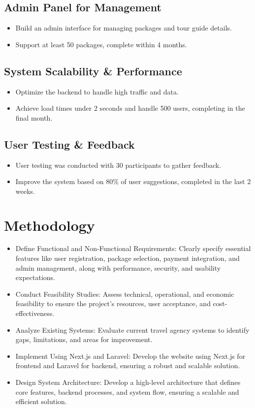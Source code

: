 \documentclass[12pt]{scrreprt}
\begin{document}
\subsection{Admin Panel for Management}
\begin{itemize}
    \item Build an admin interface for managing packages and tour guide details.
    \item Support at least 50 packages, complete within 4 months.
\end{itemize}

\subsection{System Scalability \& Performance}
\begin{itemize}
    \item Optimize the backend to handle high traffic and data.
    \item Achieve load times under 2 seconds and handle 500 users, completing in the final month.
\end{itemize}

\subsection{User Testing \& Feedback}
\begin{itemize}
    \item User testing was conducted with 30 participants to gather feedback.
    \item Improve the system based on 80\% of user suggestions, completed in the last 2 weeks.
\end{itemize}

\section{Methodology}
\begin{itemize}
    \item Define Functional and Non-Functional Requirements: Clearly specify essential features like user registration, package selection, payment integration, and admin management, along with performance, security, and usability expectations.
    \item Conduct Feasibility Studies: Assess technical, operational, and economic feasibility to ensure the project’s resources, user acceptance, and cost-effectiveness.
    \item Analyze Existing Systems: Evaluate current travel agency systems to identify gaps, limitations, and areas for improvement.
    \item Implement Using Next.js and Laravel: Develop the website using Next.js for frontend and Laravel for backend, ensuring a robust and scalable solution.
    \item Design System Architecture: Develop a high-level architecture that defines core features, backend processes, and system flow, ensuring a scalable and efficient solution.
\end{itemize}
\end{document}
